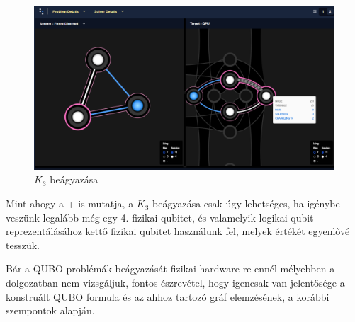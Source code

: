 \begin{figure}[!ht]
	\centering
	\includegraphics[width=150mm, keepaspectratio]{figures/embedding_3var4qubits.png}
	\caption{$K_3$ beágyazása}
	\label{fig:K3embedding}
\end{figure}

Mint ahogy a \az+ is mutatja, a $K_3$ beágyazása csak úgy lehetséges, ha igénybe veszünk legalább még egy 4. fizikai qubitet, és valamelyik logikai qubit reprezentálásához kettő fizikai qubitet használunk fel, melyek értékét egyenlővé tesszük.

Bár a QUBO problémák beágyazását fizikai hardware-re ennél mélyebben a dolgozatban nem vizsgáljuk, fontos észrevétel, hogy igencsak van jelentősége a konstruált QUBO formula és az ahhoz tartozó gráf elemzésének, a korábbi szempontok alapján.